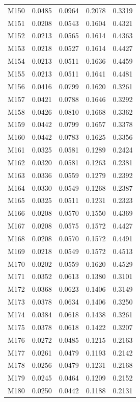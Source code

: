 \begin{longtable}{lrrrr}
M150 & 0.0485 & 0.0964 & 0.2078 & 0.3319 \\
M151 & 0.0208 & 0.0543 & 0.1604 & 0.4321 \\
M152 & 0.0213 & 0.0565 & 0.1614 & 0.4363 \\
M153 & 0.0218 & 0.0527 & 0.1614 & 0.4427 \\
M154 & 0.0213 & 0.0511 & 0.1636 & 0.4459 \\
M155 & 0.0213 & 0.0511 & 0.1641 & 0.4481 \\
M156 & 0.0416 & 0.0799 & 0.1620 & 0.3261 \\
M157 & 0.0421 & 0.0788 & 0.1646 & 0.3292 \\
M158 & 0.0426 & 0.0810 & 0.1668 & 0.3362 \\
M159 & 0.0442 & 0.0799 & 0.1657 & 0.3378 \\
M160 & 0.0442 & 0.0783 & 0.1625 & 0.3356 \\
M161 & 0.0325 & 0.0581 & 0.1289 & 0.2424 \\
M162 & 0.0320 & 0.0581 & 0.1263 & 0.2381 \\
M163 & 0.0336 & 0.0559 & 0.1279 & 0.2392 \\
M164 & 0.0330 & 0.0549 & 0.1268 & 0.2387 \\
M165 & 0.0325 & 0.0511 & 0.1231 & 0.2323 \\
M166 & 0.0208 & 0.0570 & 0.1550 & 0.4369 \\
M167 & 0.0208 & 0.0575 & 0.1572 & 0.4427 \\
M168 & 0.0208 & 0.0570 & 0.1572 & 0.4491 \\
M169 & 0.0218 & 0.0549 & 0.1572 & 0.4513 \\
M170 & 0.0202 & 0.0559 & 0.1620 & 0.4529 \\
M171 & 0.0352 & 0.0613 & 0.1380 & 0.3101 \\
M172 & 0.0368 & 0.0623 & 0.1406 & 0.3149 \\
M173 & 0.0378 & 0.0634 & 0.1406 & 0.3250 \\
M174 & 0.0384 & 0.0618 & 0.1438 & 0.3261 \\
M175 & 0.0378 & 0.0618 & 0.1422 & 0.3207 \\
M176 & 0.0272 & 0.0485 & 0.1215 & 0.2163 \\
M177 & 0.0261 & 0.0479 & 0.1193 & 0.2142 \\
M178 & 0.0256 & 0.0479 & 0.1231 & 0.2168 \\
M179 & 0.0245 & 0.0464 & 0.1209 & 0.2152 \\
M180 & 0.0250 & 0.0442 & 0.1188 & 0.2131 \\

\end{longtable}
